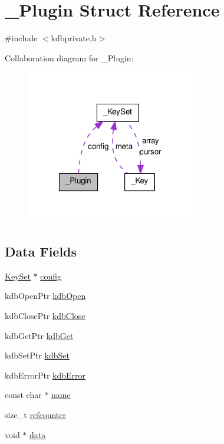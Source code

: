 \hypertarget{struct__Plugin}{
\section{\_\-Plugin Struct Reference}
\label{struct__Plugin}
}


{\ttfamily \#include $<$kdbprivate.h$>$}



Collaboration diagram for \_\-Plugin:
\nopagebreak
\begin{figure}[H]
\begin{center}
\leavevmode
\includegraphics[width=210pt]{struct__Plugin__coll__graph}
\end{center}
\end{figure}
\subsection*{Data Fields}
\begin{DoxyCompactItemize}
\item 
\hyperlink{struct__KeySet}{KeySet} $\ast$ \hyperlink{struct__Plugin_ab2515d2e11eec337550300d6f56a3d4b}{config}
\item 
kdbOpenPtr \hyperlink{struct__Plugin_ac9da7168ac65402b997a31a3b4a8d720}{kdbOpen}
\item 
kdbClosePtr \hyperlink{struct__Plugin_a5b0b2cc22ad5dcc7ec0eb570c2c6ff4b}{kdbClose}
\item 
kdbGetPtr \hyperlink{struct__Plugin_a0b2e0db2565e6f1d16f9b78112580a18}{kdbGet}
\item 
kdbSetPtr \hyperlink{struct__Plugin_acaa373d251ec25ff93335741ddb5b0e3}{kdbSet}
\item 
kdbErrorPtr \hyperlink{struct__Plugin_a621683acebfa6aac91c5903d8f6d653a}{kdbError}
\item 
const char $\ast$ \hyperlink{struct__Plugin_ad3ca225d725b5ae7b46754c025007a75}{name}
\item 
size\_\-t \hyperlink{struct__Plugin_a9be13e52b86cb351edd25a143d186da3}{refcounter}
\item 
void $\ast$ \hyperlink{struct__Plugin_ad2e6fd0b76939b20008e9cc046a06779}{data}
\end{DoxyCompactItemize}


